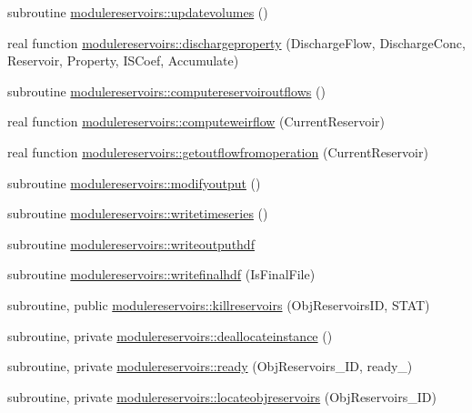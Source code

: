 \begin{DoxyCompactItemize}
subroutine \mbox{\hyperlink{namespacemodulereservoirs_a2af994aa3f7d8318c768f2960bb34e06}{modulereservoirs\+::updatevolumes}} ()
\item 
real function \mbox{\hyperlink{namespacemodulereservoirs_ad77a25bc54ff54f0753ca4576febd9fb}{modulereservoirs\+::dischargeproperty}} (Discharge\+Flow, Discharge\+Conc, Reservoir, Property, I\+S\+Coef, Accumulate)
\item 
subroutine \mbox{\hyperlink{namespacemodulereservoirs_a20b9abb4646405dacdb0a0927de2ec9b}{modulereservoirs\+::computereservoiroutflows}} ()
\item 
real function \mbox{\hyperlink{namespacemodulereservoirs_afd25bc9bcd078252383e6f67ef148826}{modulereservoirs\+::computeweirflow}} (Current\+Reservoir)
\item 
real function \mbox{\hyperlink{namespacemodulereservoirs_ac1692cb00cb68968ee7099ff5bf14ed0}{modulereservoirs\+::getoutflowfromoperation}} (Current\+Reservoir)
\item 
subroutine \mbox{\hyperlink{namespacemodulereservoirs_a72a469df722e5436ce882168e7d1c0bb}{modulereservoirs\+::modifyoutput}} ()
\item 
subroutine \mbox{\hyperlink{namespacemodulereservoirs_a8f4552bc7aa4adbe0bb04d768353a7b4}{modulereservoirs\+::writetimeseries}} ()
\item 
subroutine \mbox{\hyperlink{namespacemodulereservoirs_acfc5816f94fa9d8f10e180691ee50039}{modulereservoirs\+::writeoutputhdf}}
\item 
subroutine \mbox{\hyperlink{namespacemodulereservoirs_ab10c15bc98d09e4f38187f218fce8925}{modulereservoirs\+::writefinalhdf}} (Is\+Final\+File)
\item 
subroutine, public \mbox{\hyperlink{namespacemodulereservoirs_a7b14b20d3da20267f728eae98a202e5e}{modulereservoirs\+::killreservoirs}} (Obj\+Reservoirs\+ID, S\+T\+AT)
\item 
subroutine, private \mbox{\hyperlink{namespacemodulereservoirs_a8f177c238d3cfcadea634aef11e22772}{modulereservoirs\+::deallocateinstance}} ()
\item 
subroutine, private \mbox{\hyperlink{namespacemodulereservoirs_a5aff53aba3466a0410c29761e37a55a5}{modulereservoirs\+::ready}} (Obj\+Reservoirs\+\_\+\+ID, ready\+\_\+)
\item 
subroutine, private \mbox{\hyperlink{namespacemodulereservoirs_a777d3a0c23fa5c2ea11ed589e1d23711}{modulereservoirs\+::locateobjreservoirs}} (Obj\+Reservoirs\+\_\+\+ID)
\end{DoxyCompactItemize}
